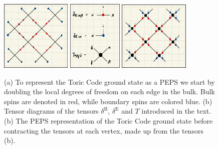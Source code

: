 \begin{figure}
	\centering
	\subcaptionbox{\label{fig:toric_code_doubling_dof}}
	{%
		\includegraphics[width=0.3\textwidth]{figures/Toric_Code/toric_code_doubling_dof.jpeg}
	}
	\subcaptionbox{\label{fig:toric_code_PEPS_representation_tensor_definitions}}
	{%
		\includegraphics[width=0.233\textwidth]{figures/Toric_Code/toric_code_PEPS_representation_tensor_definitions.jpeg}
	}
	\subcaptionbox{\label{fig:toric_code_PEPS_representation}}
	{%
		\includegraphics[width=0.3\textwidth]{figures/Toric_Code/toric_code_PEPS_representation.jpeg}
	}
	\caption{(a) To represent the Toric Code ground state as a PEPS we start by doubling the local degrees of freedom on each edge in the bulk. Bulk spins are denoted in red, while boundary spins are colored blue. (b) Tensor diagrams of the tensors $\delta^\text{B}$, $\delta^\text{E}$ and $T$ introduced in the text. (b) The PEPS representation of the Toric Code ground state before contracting the tensors at each vertex, made up from the tensors (b).}
	\label{fig:toric_code_doubling_dof_and_PEPS_representation}
\end{figure}

